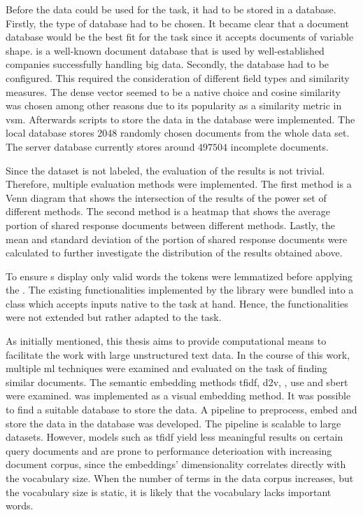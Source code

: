 Before the data could be used for the task, it had to be stored in a database.
Firstly, the type of database had to be chosen.
It became clear that a document database would be the best fit for the task 
since it accepts documents of variable shape.
\databaseName{} is a well-known document database that is used by 
well-established companies successfully handling big data.
Secondly, the database had to be configured.
This required the consideration of different field types and similarity measures.
The dense vector seemed to be a native choice and cosine similarity was chosen 
among other reasons due to its popularity as a similarity metric in \ac{vsm}.
Afterwards scripts to store the data in the database were implemented.
The local database stores 2048 randomly chosen documents from the whole data set.
The server database currently stores around $497504$ incomplete documents.

Since the dataset is not labeled, the evaluation of the results is not trivial.
Therefore, multiple evaluation methods were implemented.
The first method is a Venn diagram that shows the intersection of the results of the power set of different methods.
The second method is a heatmap that shows the average portion of shared response documents between different methods.
Lastly, the mean and standard deviation of the portion of shared response documents were calculated 
to further investigate the distribution of the results obtained above.

To ensure \wordcloud{}s display only valid words the tokens were lemmatized before applying the \wordcloud{}. 
The existing functionalities implemented by the library \topTwovec{} were bundled into a class 
which accepts inputs native to the task at hand.
Hence, the functionalities were not extended but rather adapted to the task.  


As initially mentioned, this thesis aims to provide computational means to facilitate the work with large unstructured text data.
In the course of this work, multiple \ac{ml} techniques were examined and evaluated on the task of finding similar documents.
The semantic embedding methods \ac{tfidf}, \ac{d2v}, \infersent{}, \ac{use} and \ac{sbert} were examined.
\eigendocs{} was implemented as a visual embedding method.
It was possible to find a suitable database to store the data.
A pipeline to preprocess, embed and store the data in the database was developed.
The pipeline is scalable to large datasets.
However, models such as \ac{tfidf} yield less meaningful results on certain query documents and 
are prone to performance deterioation with increasing document corpus, since the embeddings' 
dimensionality correlates directly with the vocabulary size.
When the number of terms in the data corpus increases, but the vocabulary size is static, 
it is likely that the vocabulary lacks important words. 

